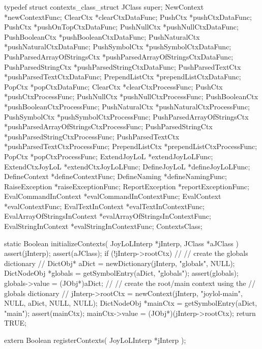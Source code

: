 \startCHeader
typedef struct contexts_class_struct {
  JClass           super;
  NewContext      *newContextFunc;
  ClearCtx        *clearCtxDataFunc;
  PushCtx         *pushCtxDataFunc; 
  PushCtx         *pushOnTopCtxDataFunc; 
  PushNullCtx     *pushNullCtxDataFunc;
  PushBooleanCtx  *pushBooleanCtxDataFunc;
  PushNaturalCtx  *pushNaturalCtxDataFunc;
  PushSymbolCtx   *pushSymbolCtxDataFunc;
  PushParsedArrayOfStringsCtx 
    *pushParsedArrayOfStringsCtxDataFunc;
  PushParsedStringCtx
    *pushParsedStringCtxDataFunc;
  PushParsedTextCtx
    *pushParsedTextCtxDataFunc;
  PrependListCtx  *prependListCtxDataFunc;
  PopCtx          *popCtxDataFunc;
  ClearCtx        *clearCtxProcessFunc;
  PushCtx         *pushCtxProcessFunc;
  PushNullCtx     *pushNullCtxProcessFunc;
  PushBooleanCtx  *pushBooleanCtxProcessFunc;
  PushNaturalCtx  *pushNaturalCtxProcessFunc;
  PushSymbolCtx   *pushSymbolCtxProcessFunc;
  PushParsedArrayOfStringsCtx
    *pushParsedArrayOfStringsCtxProcessFunc;
  PushParsedStringCtx
    *pushParsedStringCtxProcessFunc;
  PushParsedTextCtx
    *pushParsedTextCtxProcessFunc;
  PrependListCtx  *prependListCtxProcessFunc;
  PopCtx          *popCtxProcessFunc;
  ExtendJoyLoL    *extendJoyLoLFunc;
  ExtendCtxJoyLoL *extendCtxJoyLoLFunc;
  DefineJoyLoL    *defineJoyLoLFunc;
  DefineContext   *defineContextFunc;
  DefineNaming    *defineNamingFunc;
  RaiseException  *raiseExceptionFunc;
  ReportException
    *reportExceptionFunc;
  EvalCommandInContext
    *evalCommandInContextFunc;
  EvalContext     *evalContextFunc;
  EvalTextInContext
    *evalTextInContextFunc;
  EvalArrayOfStringsInContext
    *evalArrayOfStringsInContextFunc;
  EvalStringInContext
    *evalStringInContextFunc;
} ContextsClass;
\stopCHeader

\startCCode
static Boolean initializeContexts(
  JoyLoLInterp *jInterp,
  JClass   *aJClass
) {
  assert(jInterp);
  assert(aJClass);
  if (!jInterp->rootCtx) {
    //
    // create the globals dictionary
    //
    DictObj* aDict = newDictionary(jInterp, "globals", NULL);
    DictNodeObj *globals = getSymbolEntry(aDict, "globals");
    assert(globals);
    globals->value = (JObj*)aDict;
    //
    // create the root/main context using the 
    // globals dictionary
    //
    jInterp->rootCtx =
      newContext(jInterp, "joylol-main", NULL, aDict, NULL, NULL);
    DictNodeObj *mainCtx = getSymbolEntry(aDict, "main");
    assert(mainCtx);
    mainCtx->value = (JObj*)(jInterp->rootCtx);
  }
  return TRUE;
}
\stopCCode

\startCHeader
extern Boolean registerContexts(
  JoyLoLInterp *jInterp
);
\stopCHeader
{}

